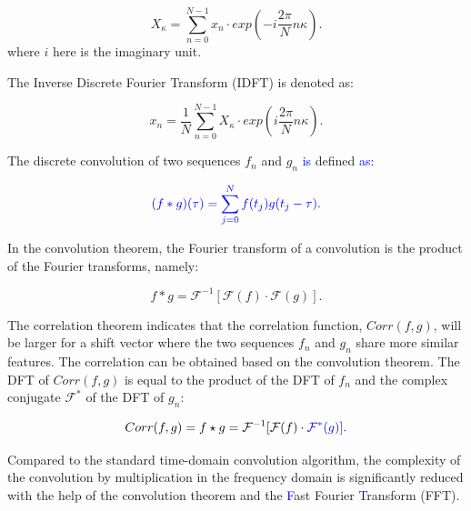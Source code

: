 \documentclass[letterpaper, 10 pt, conference]{ieeeconf}  %
\begin{document}
\begin{equation}\label{equ24}
    X_{\kappa} = \sum_{n=0}^{N-1}x_{n}\cdot exp(-i\frac{2\pi}{N}n\kappa).
\end{equation}
where $i$ here is the imaginary unit.

The Inverse Discrete Fourier Transform (IDFT) is denoted as:

\begin{equation}\label{equ25}
    x_{n} = \frac{1}{N}\sum_{n=0}^{N-1}X_{\kappa}\cdot exp(i\frac{2\pi}{N}n\kappa).
\end{equation}

The discrete convolution of two sequences $f_{n}$ and $g_{n}$ \textcolor{blue}{is} %
defined \textcolor{blue}{as:}

\begin{equation}\label{equ26}
	\textcolor{blue}{(f \ast g)(\tau)=\sum_{j=0}^{N}f(t_{j})g(t_{j}-\tau).}
\end{equation}

In the convolution theorem, the Fourier transform of a convolution is the product of the Fourier transforms, namely:

\begin{equation}\label{equ27}
    f \ast g = \mathcal{F}^{-1} [\mathcal{F}(f) \cdot \mathcal{F}(g)].
\end{equation}

The correlation theorem indicates that the correlation function, $Corr(f,g)$, will be larger for a shift vector where the two sequences $f_n$ and $g_n$ %
share more similar features. The correlation can be obtained based on the convolution theorem. The DFT of $Corr(f,g)$ is equal to the product of the DFT of $f_{n}$ and the complex conjugate $\mathcal{F}^{*}$ of the DFT of $g_n$:

\begin{equation}\label{equ28}
    Corr(f,g)=f \star g = \mathcal{F}^{-1}[\mathcal{F}(f) \cdot \textcolor{blue}{\mathcal{F^{*}}(g)].}%
\end{equation}

Compared to the standard time-domain convolution algorithm, the complexity of the convolution by multiplication in the frequency domain is significantly reduced with the help of the convolution theorem and the %
\textcolor{blue}{F}ast Fourier %
\textcolor{blue}{T}ransform (FFT).
\end{document}

